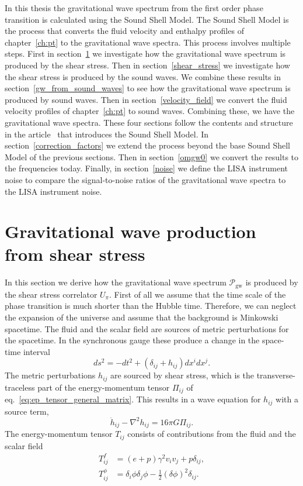 In this thesis the gravitational wave spectrum from the first order phase transition is calculated using the Sound Shell Model.
The Sound Shell Model is the process
that converts the fluid velocity and enthalpy profiles of chapter~\ref{ch:pt} to the gravitational wave spectra.
This process involves multiple steps.
First in section~\ref{gw_production} we investigate how the gravitational wave spectrum is produced by the shear stress.
Then in section~\ref{shear_stress} we investigate how the shear stress is produced by the sound waves.
We combine these results in section~\ref{gw_from_sound_waves}
to see how the gravitational wave spectrum is produced by sound waves.
Then in section~\ref{velocity_field} we convert the fluid velocity profiles of chapter~\ref{ch:pt} to sound waves.
Combining these, we have the gravitational wave spectra.
These four sections follow the contents and structure in the article~\cite{hindmarsh_gw_pt_2019} that introduces the Sound Shell Model.
In section~\ref{correction_factors} we extend the process beyond the base Sound Shell Model of the previous sections.
Then in section~\ref{omgw0} we convert the results to the frequencies today.
Finally, in section~\ref{noise} we define the LISA instrument noise
to compare the signal-to-noise ratios of the gravitational wave spectra to the LISA instrument noise.


\section{Gravitational wave production from shear stress}
\label{gw_production}
In this section we derive how the gravitational wave spectrum $\mathcal{P}_\text{gw}$ is produced by the shear stress correlator $U_\pi$.
First of all we assume that the time scale of the phase transition is much shorter than the Hubble time.
Therefore, we can neglect the expansion of the universe and assume that the background is Minkowski spacetime.
The fluid and the scalar field are sources of metric perturbations for the spacetime.
In the synchronous gauge these produce a change in the space-time interval
\cite[p. 7]{hindmarsh_gw_pt_2019}
\begin{equation}
ds^2 = -dt^2 + (\delta_{ij} + h_{ij}) dx^i dx^j.
\end{equation}
The metric perturbations $h_{ij}$ are sourced by shear stress,
which is the transverse-traceless part of the energy-momentum tensor $\Pi_{ij}$ of eq.~\eqref{eq:ep_tensor_general_matrix}.
This results in a wave equation for $h_{ij}$ with a source term,
\cites[eq. 3.1]{hindmarsh_gw_pt_2019}[eq. 1.24]{maggiore_gw_2008}
\begin{equation}
\ddot{h}_{ij} - \nabla^2 h_{ij} = 16 \pi G \Pi_{ij}.
\end{equation}
The energy-momentum tensor $T_{ij}$ consists of contributions from the fluid and the scalar field~\cite[p. 7]{hindmarsh_gw_pt_2019}
\begin{align}
T^f_{ij}    &= (e+p) \gamma^2 v_i v_j + p \delta_{ij}, \\
T^\phi_{ij} &= \delta_i \phi \delta_j \phi - \frac{1}{2}(\delta \phi)^2 \delta_{ij}.
\end{align}

